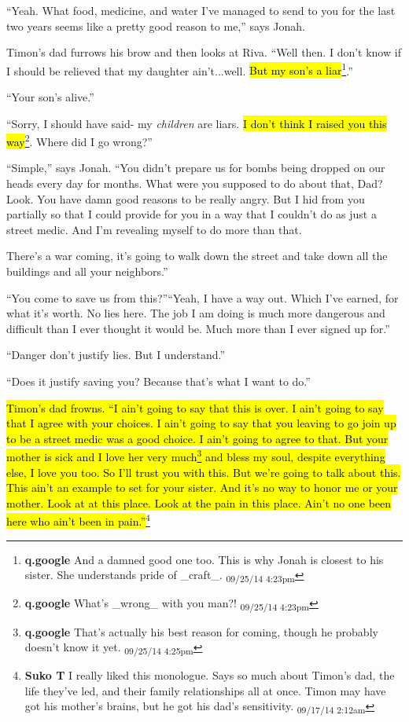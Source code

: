 ``Yeah.  What food, medicine, and water I've managed to send to you for the last two years seems like a pretty good reason to me,'' says Jonah.

Timon's dad furrows his brow and then looks at Riva.  ``Well then.  I don't know if I should be relieved that my daughter ain't...well.  \hl{But my son's a liar}\footnote{\textbf{q.google }And a damned good one too.  This is why Jonah is closest to his sister.  She understands pride of \_craft\_. \textsubscript{09/25/14 4:23pm}}.''

``Your son's alive.''

``Sorry, I should have said- my \textit{children} are liars.  \hl{I don't think I raised you this way}\footnote{\textbf{q.google }What's \_wrong\_ with you man?! \textsubscript{09/25/14 4:23pm}}.  Where did I go wrong?''

``Simple,'' says Jonah.  ``You didn't prepare us for bombs being dropped on our heads every day for months.  What were you supposed to do about that, Dad?  Look.  You have damn good reasons to be really angry.  But I hid from you partially so that I could provide for you in a way that I couldn't do as just a street medic.  And I'm revealing myself to do more than that.  

There's a war coming, it's going to walk down the street and take down all the buildings and all your neighbors.''

``You come to save us from this?''``Yeah, I have a way out.  Which I've earned, for what it's worth.  No lies here.  The job I am doing is much more dangerous and difficult than I ever thought it would be.  Much more than I ever signed up for.''

``Danger don't justify lies.  But I understand.''

``Does it justify saving you?  Because that's what I want to do.''

\hl{Timon's dad frowns.  ``I ain't going to say that this is over.  I ain't going to say that I agree with your choices.  I ain't going to say that you leaving to go join up to be a street medic was a good choice.  I ain't going to agree to that.  But your mother is sick and I love her very much\footnote{\textbf{q.google }That's actually his best reason for coming, though he probably doesn't know it yet. \textsubscript{09/25/14 4:25pm}} and bless my soul, despite everything else, I love you too.  So I'll trust you with this.  But we're going to talk about this.  This ain't an example to set for your sister.  And it's no way to honor me or your mother.  Look at at this place.  Look at the pain in this place.  Ain't no one been here who ain't been in pain.''}\footnote{\textbf{Suko T }I really liked this monologue.  Says so much about Timon's dad, the life they've led, and their family relationships all at once.  Timon may have got his mother's brains, but he got his dad's sensitivity. \textsubscript{09/17/14 2:12am}}

